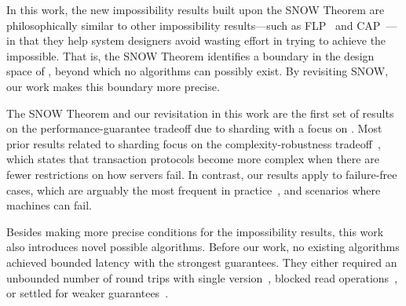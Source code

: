 In this work, the new impossibility results built upon the SNOW Theorem are philosophically similar to other impossibility results---such as FLP~\cite{Fischer:pds1983} and CAP~\cite{Brewer:pdc2000, Gilbert:sigact2002}---in that they help system designers avoid wasting effort in trying to achieve the impossible. That is, the SNOW Theorem identifies a boundary in the design space of \rots{}, beyond which no algorithms can possibly exist. By revisiting SNOW, our work makes this boundary more precise. 


The SNOW Theorem and our revisitation in this work are the first set of results on the performance-guarantee tradeoff due to sharding with a focus on \rots{}. Most prior results related to sharding focus on the complexity-robustness tradeoff~\cite{Guerraoui:pods2017}, which states that transaction protocols become more complex when there are fewer restrictions on how servers fail. In contrast, our results apply to failure-free cases, which are arguably the most frequent in practice~\cite{Guerraoui:pods2017}, and scenarios where machines can fail.

Besides making more precise conditions for the impossibility results, this work also
introduces novel possible algorithms.
Before our work, no existing algorithms achieved bounded latency with the strongest guarantees. They either required an unbounded number of round trips with single version~\cite{Lloyd:nsdi2013, Wei:sosp2015, Lee:sosp2015, Aguilera:sosp2007}, blocked read operations~\cite{Corbett:osdi2012, SNOW2016}, or settled for weaker guarantees~\cite{Corbett:osdi2012, Aguilera:sosp2015, Bailis:sigmod2014, Lloyd:sosp2011}.


